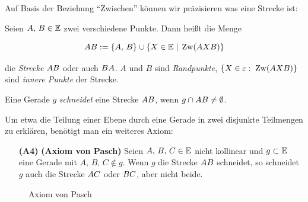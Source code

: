 
Auf Basis der Beziehung "`Zwischen"' können wir präzisieren was eine Strecke ist:

\begin{defi}[Strecke]
    Seien $A,\,B\in \mathbb E$ zwei verschiedene Punkte. Dann heißt die Menge

    $$
    {AB}:=\{A,\,B\}\cup\{X\in\mathbb E \; | \;\operatorname{Zw}(AXB)\}
    $$

    die {\em Strecke} ${AB}$ oder auch ${BA}$. $A$ und $B$ sind {\em Randpunkte}, $\{X \in
    \varepsilon:\; \operatorname{Zw}(AXB)\}$ sind {\em innere Punkte} der Strecke.
\end{defi}

Eine Gerade $g$ \emph{schneidet} eine Strecke ${AB}$, wenn $g\cap{AB}\neq \emptyset$.

Um etwa die Teilung einer Ebene durch eine Gerade in zwei disjunkte Teilmengen
zu erklären, benötigt man ein weiteres Axiom:


\begin{enumerate}
    \item[{\bf (A4)}] {\bf (Axiom von Pasch)} Seien $A,\,B,\,C\in\mathbb E$ nicht kollinear und
        $g\subset\mathbb E$ eine Gerade mit $A,\,B,\,C\notin g$. Wenn $g$ die Strecke ${AB}$ schneidet,
        so schneidet $g$ auch die Strecke ${AC}$ oder ${BC}$, aber nicht beide.
\end{enumerate}


\begin{figure}[h]
    
    \caption{Axiom von Pasch}
\end{figure}



